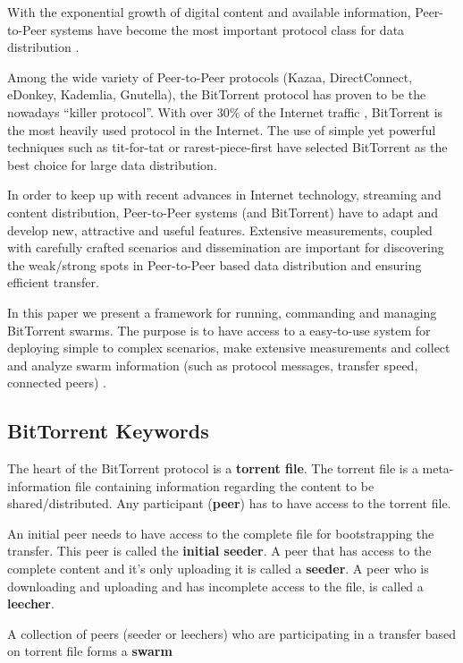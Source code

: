 




With the exponential growth of digital content and available information,
Peer-to-Peer systems have become the most important protocol class for data
distribution \cite{ipoque}.

Among the wide variety of Peer-to-Peer protocols (Kazaa, DirectConnect,
eDonkey, Kademlia, Gnutella), the BitTorrent protocol has proven to be the
nowadays ``killer protocol''.  With over 30\% of the Internet traffic
\cite{ipoque}, BitTorrent is the most heavily used protocol in the Internet.
The use of simple yet powerful techniques such as tit-for-tat or
rarest-piece-first have selected BitTorrent as the best choice for large data
distribution.

In order to keep up with recent advances in Internet technology, streaming and
content distribution, Peer-to-Peer systems (and BitTorrent) have to adapt and
develop new, attractive and useful features. Extensive measurements, coupled
with carefully crafted scenarios and dissemination are important for
discovering the weak/strong spots in Peer-to-Peer based data distribution and
ensuring efficient transfer.

In this paper we present a framework for running, commanding and managing
BitTorrent swarms. The purpose is to have access to a easy-to-use system for
deploying simple to complex scenarios, make extensive measurements and collect
and analyze swarm information (such as protocol messages, transfer speed,
connected peers) \cite{bt-swarm-analysis}.

\subsection{BitTorrent Keywords}

The heart of the BitTorrent protocol is a \textbf{torrent file}. The torrent
file is a meta-information file containing information regarding the content to
be shared/distributed. Any participant (\textbf{peer}) has to have access to
the torrent file.

An initial peer needs to have access to the complete file for bootstrapping the
transfer. This peer is called the \textbf{initial seeder}. A peer that has
access to the complete content and it's only uploading it is called a
\textbf{seeder}. A peer who is downloading and uploading and has incomplete 
access to the file, is called a \textbf{leecher}.



A collection of peers (seeder or leechers) who are  participating in a transfer 
based on torrent file forms a \textbf{swarm}

